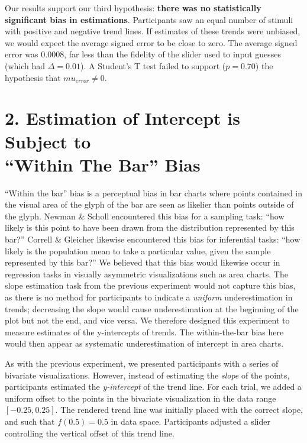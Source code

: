 \documentclass{sigchi}
\begin{document}
Our results support our third hypothesis: \textbf{there was no statistically significant bias in estimations}. Participants saw an equal number of stimuli with positive and negative trend lines. If estimates of these trends were unbiased, we would expect the average signed error to be close to zero. The average signed error was $0.0008$, far less than the fidelity of the slider used to input guesses (which had $\Delta=0.01$). A Student's T test failed to support ($p=0.70$) the hypothesis that $mu_{error}\ne0$.

\section{2. Estimation of Intercept is Subject to \\ ``Within The Bar'' Bias}

``Within the bar'' bias is a perceptual bias in bar charts where points contained in the visual area of the glyph of the bar are seen as likelier than points outside of the glyph. Newman \& Scholl \cite{newman2012bar} encountered this bias for a sampling task: ``how likely is this point to have been drawn from the distribution represented by this bar?'' Correll \& Gleicher \cite{correll2014error} likewise encountered this bias for inferential tasks: ``how likely is the population mean to take a particular value, given the sample represented by this bar?'' We believed that this bias would likewise occur in regression tasks in visually asymmetric visualizations such as area charts. The slope estimation task from the previous experiment would not capture this bias, as there is no method for participants to indicate a \emph{uniform} underestimation in trends; decreasing the slope would cause underestimation at the beginning of the plot but not the end, and vice versa. We therefore designed this experiment to measure estimates of the y-intercepts of trends. The within-the-bar bias here would then appear as systematic underestimation of intercept in area charts.

As with the previous experiment, we presented participants with a series of bivariate visualizations. However, instead of estimating the \emph{slope} of the points, participants estimated the \emph{y-intercept} of the trend line. For each trial, we added a uniform offset to the points in the bivariate visualization in the data range $[-0.25,0.25]$. The rendered trend line was initially placed with the correct slope, and such that $f(0.5)=0.5$ in data space. Participants adjusted a slider controlling the vertical offset of this trend line.
\end{document}
